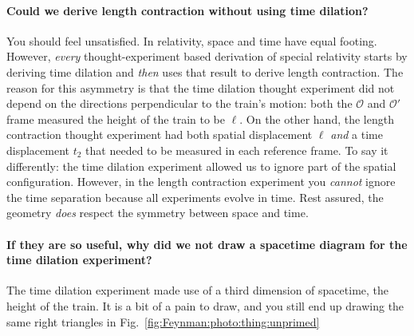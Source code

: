 \documentclass[12pt, oneside]{report}    %
\begin{document}
\begin{subappendices}
\paragraph{Could we derive length contraction without using time dilation?} You should feel unsatisfied. In relativity, space and time have equal footing. However, \emph{every} thought-experiment based derivation of special relativity starts by deriving time dilation and \emph{then} uses that result to derive length contraction. The reason for this asymmetry is that the time dilation thought experiment did not depend on the directions perpendicular to the train's motion: both the $\mathcal O$ and $\mathcal O'$ frame measured the height of the train to be $\ell$. On the other hand, the length contraction thought experiment had both spatial displacement $\ell$ \emph{and} a time displacement $t_2$ that needed to be measured in each reference frame. To say it differently: the time dilation experiment allowed us to ignore part of the spatial configuration. However, in the length contraction experiment you \emph{cannot} ignore the time separation because all experiments evolve in time. Rest assured, the geometry \emph{does} respect the symmetry between space and time.

\paragraph{If they are so useful, why did we not draw a spacetime diagram for the time dilation experiment?} The time dilation experiment made use of a third dimension of spacetime, the height of the train. It is a bit of a pain to draw, and you still end up drawing the same right triangles in Fig.~\ref{fig:Feynman:photo:thing:unprimed}



\end{subappendices}
\end{document}
